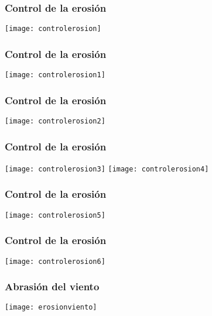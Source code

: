\documentclass{beamer}
\begin{document}
\begin{frame}
\frametitle{Control de la erosión}
\begin{center}
\texttt{[image: controlerosion]}
\end{center}
\end{frame}
\begin{frame}
\frametitle{Control de la erosión}
\begin{center}
\texttt{[image: controlerosion1]}
\end{center}
\end{frame}
\begin{frame}
\frametitle{Control de la erosión}
\begin{center}
\texttt{[image: controlerosion2]}
\end{center}
\end{frame}
\begin{frame}
\frametitle{Control de la erosión}
\begin{center}
\texttt{[image: controlerosion3]}
\texttt{[image: controlerosion4]}
\end{center}
\end{frame}
\begin{frame}
\frametitle{Control de la erosión}
\begin{center}
\texttt{[image: controlerosion5]}
\end{center}
\end{frame}
\begin{frame}
\frametitle{Control de la erosión}
\begin{center}
\texttt{[image: controlerosion6]}
\end{center}
\end{frame}
\begin{frame}
\frametitle{Abrasión del viento}
\begin{center}
\texttt{[image: erosionviento]}
\end{center}
\end{frame}
\end{document}
